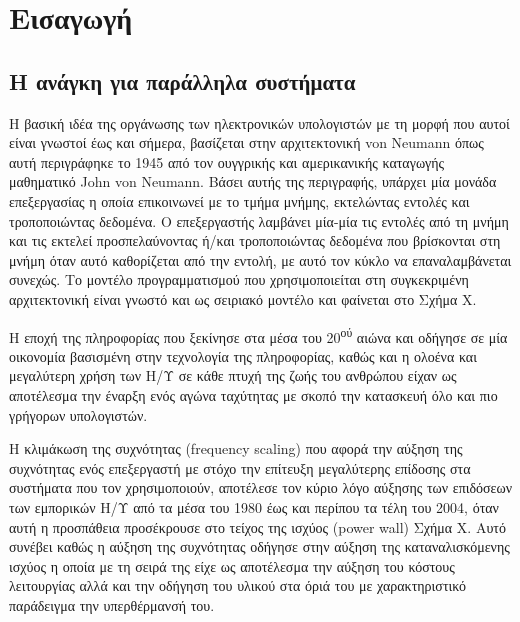\chapter{Εισαγωγή}
\label{ch:Introduction}

\section{Η ανάγκη για παράλληλα συστήματα} %
\label{sec:The need for parallel systems}
Η βασική ιδέα της οργάνωσης των ηλεκτρονικών υπολογιστών με τη μορφή που αυτοί είναι γνωστοί έως και σήμερα, βασίζεται στην αρχιτεκτονική von Neumann όπως αυτή περιγράφηκε το 1945 από τον ουγγρικής και αμερικανικής καταγωγής μαθηματικό John von Neumann. Βάσει αυτής της περιγραφής, υπάρχει μία μονάδα επεξεργασίας η οποία επικοινωνεί με το τμήμα μνήμης, εκτελώντας εντολές και τροποποιώντας δεδομένα. Ο επεξεργαστής λαμβάνει μία-μία τις εντολές από τη μνήμη και τις εκτελεί προσπελαύνοντας ή/και τροποποιώντας δεδομένα που βρίσκονται στη μνήμη όταν αυτό καθορίζεται από την εντολή, με αυτό τον κύκλο να επαναλαμβάνεται συνεχώς. Το μοντέλο προγραμματισμού που χρησιμοποιείται στη συγκεκριμένη αρχιτεκτονική είναι γνωστό και ως σειριακό μοντέλο και φαίνεται στο Σχήμα X.

Η εποχή της πληροφορίας που ξεκίνησε στα μέσα του 20\textsuperscript{ού} αιώνα και οδήγησε σε μία οικονομία βασισμένη στην τεχνολογία της πληροφορίας, καθώς και η ολοένα και μεγαλύτερη χρήση των Η/Υ σε κάθε πτυχή της ζωής του ανθρώπου είχαν ως αποτέλεσμα την έναρξη ενός αγώνα ταχύτητας με σκοπό την κατασκευή όλο και πιο γρήγορων υπολογιστών.

Η κλιμάκωση της συχνότητας (frequency scaling) που αφορά την αύξηση της συχνότητας ενός επεξεργαστή με στόχο την επίτευξη μεγαλύτερης επίδοσης στα συστήματα που τον χρησιμοποιούν, αποτέλεσε τον κύριο λόγο αύξησης των επιδόσεων των εμπορικών Η/Υ από τα μέσα του 1980 έως και περίπου τα τέλη του 2004, όταν αυτή η προσπάθεια προσέκρουσε στο τείχος της ισχύος (power wall) Σχήμα Χ. Αυτό συνέβει καθώς η αύξηση της συχνότητας οδήγησε στην αύξηση της καταναλισκόμενης ισχύος η οποία με τη σειρά της είχε ως αποτέλεσμα την αύξηση του κόστους λειτουργίας αλλά και την οδήγηση του υλικού στα όριά του με χαρακτηριστικό παράδειγμα την υπερθέρμανσή του.


